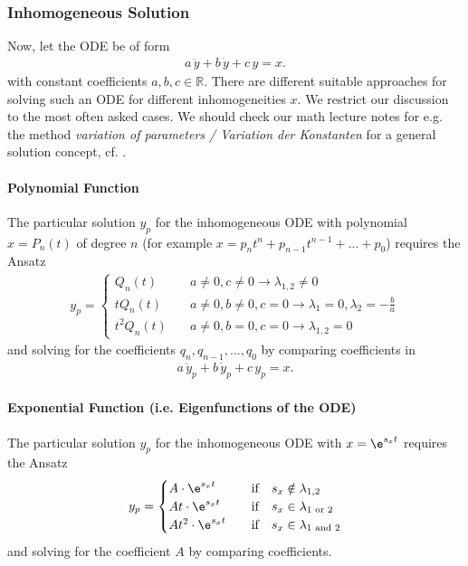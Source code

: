 \subsubsection{Inhomogeneous Solution}
Now, let the ODE be of form
\begin{align}
a \, \ddot{y} + b \, \dot{y} + c \, y = x.
\end{align}
with constant coefficients $a, b, c\in \mathbb{R}$.
%
There are different suitable approaches for solving such an ODE for
different inhomogeneities $x$.
We restrict our discussion to the most often asked cases.
We should check our math lecture notes for e.g. the method
\textit{variation of parameters / Variation der Konstanten} for a general
solution concept, cf. \cite{Burg2013}.

\paragraph{Polynomial Function}
The particular solution $y_p$ for the inhomogeneous ODE with
polynomial $x = P_n(t)$ of degree $n$
(for example $x = p_n t^n + p_{n-1} t^{n-1} + ... +p_0$)
requires the Ansatz
\begin{align}
y_p =
\begin{cases}
Q_n(t)&\quad a\neq 0, c\neq 0 \rightarrow \lambda_{1,2} \neq 0\\
t Q_n(t)&\quad a\neq 0, b\neq 0, c=0 \rightarrow \lambda_1=0,\lambda_2 = -\frac{b}{a}\\
t^2 Q_n(t)&\quad a\neq 0, b=0, c=0  \rightarrow \lambda_{1,2} = 0
\end{cases}
\end{align}
and solving for the coefficients $q_n, q_{n-1},...,q_0$ by comparing
coefficients in
\begin{align}
a \, \ddot{y}_p + b \, \dot{y}_p + c \, y_p = x.
\end{align}

\paragraph{Exponential Function (i.e. Eigenfunctions of the ODE)}
The particular solution $y_p$ for the inhomogeneous ODE with
$x = \e^{s_x t}$
requires the Ansatz
\begin{align}
y_p =
\begin{cases}
A \cdot \e^{s_x t}&\quad \text{if} \quad  s_x \notin \lambda_{1,2}\\
A t \cdot \e^{s_x t}&\quad \text{if} \quad s_x \in \lambda_{1 \text{ or } 2}\\
A t^2 \cdot \e^{s_x t}&\quad \text{if} \quad s_x \in \lambda_{1 \text{ and } 2}
\end{cases}
\end{align}
and solving for the coefficient $A$ by comparing coefficients.

